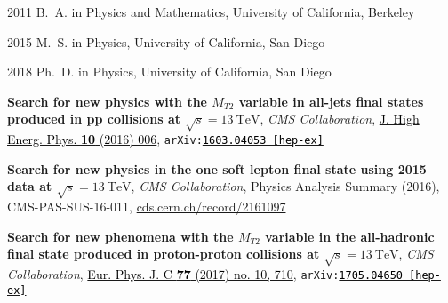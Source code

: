\begin{frontmatter}
\begin{vitapage}                                                               
\begin{vita}                                                                   
  \item[2011] B.~A. in Physics and Mathematics, University of California, Berkeley                                                    
  \item[2015] M.~S. in Physics, University of California, San Diego                                                    
  \item[2018] Ph.~D. in Physics, University of California, San Diego    
\end{vita}                                                                     
\begin{publications}                                                           
\item \textbf{Search for new physics with the $M_{T2}$ variable in all-jets final states produced in pp collisions at $\sqrt{s}=13~\mathrm{TeV}$}, {\it CMS Collaboration},  \href{http://dx.doi.org/10.1007/JHEP10(2016)006}{\textcolor{black}{J. High Energ. Phys. \textbf{10} (2016) 006}}, {\tt arXiv:\href{http://arxiv.org/abs/1603.04053}{\textcolor{black}{1603.04053 [hep-ex]}}}
\item \textbf{Search for new physics in the one soft lepton final state using 2015 data at $\sqrt{s}=13~\mathrm{TeV}$}, {\it CMS Collaboration}, Physics Analysis Summary (2016), CMS-PAS-SUS-16-011, \textcolor{black}{\href{https://cds.cern.ch/record/2161097}{cds.cern.ch/record/2161097}}
\item \textbf{Search for new phenomena with the $M_{T2}$ variable in the all-hadronic final state produced in proton-proton collisions at $\sqrt{s}=13~\mathrm{TeV}$}, {\it CMS Collaboration}, \href{http://dx.doi.org/10.1140/epjc/s10052-017-5267-x}{\textcolor{black}{Eur. Phys. J. C {\bf77} (2017) no. 10, 710}}, {\tt arXiv:\href{http://arxiv.org/abs/1705.04650}{\textcolor{black}{1705.04650 [hep-ex]}}}

\end{publications}                                                             
\end{vitapage}                                                                 
                                                                               


\end{frontmatter}
